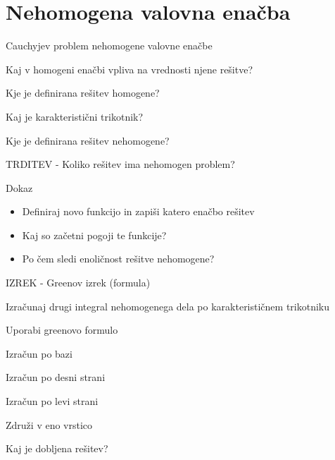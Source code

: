 \documentclass{article}
\begin{document}
    \section{Nehomogena valovna enačba}
    \begin{enumerate}
        \item Cauchyjev problem nehomogene valovne enačbe
        {\color{red}\item Kaj v homogeni enačbi vpliva na vrednosti njene rešitve?}
        \item Kje je definirana rešitev homogene?
        \item Kaj je karakteristični trikotnik?
        \item Kje je definirana rešitev nehomogene?
        {\color{red}\item TRDITEV - Koliko rešitev ima nehomogen problem?}
        {\color{red}\item Dokaz}
        {\color{red}\begin{itemize}
            \item Definiraj novo funkcijo in zapiši katero enačbo rešitev
            \item Kaj so začetni pogoji te funkcije?
            \item Po čem sledi enoličnost rešitve nehomogene?
        \end{itemize}}
        {\color{red}\item IZREK - Greenov izrek (formula)}
        \item Izračunaj drugi integral nehomogenega dela po karakterističnem trikotniku
        \begin{itemize}
            {\color{red}\item Uporabi greenovo formulo}
            {\color{red}\item Izračun po bazi}
            {\color{red}\item Izračun po desni strani}
            {\color{red}\item Izračun po levi strani}
            \item Združi v eno vrstico
            \item Kaj je dobljena rešitev?
        \end{itemize}
    \end{enumerate}
\end{document}

